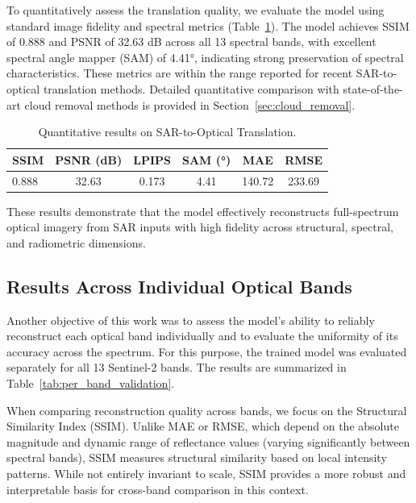 To quantitatively assess the translation quality, we evaluate the model using standard image fidelity and spectral metrics (Table~\ref{tab:quantitative_result_translation}). The model achieves SSIM of 0.888 and PSNR of 32.63 dB across all 13 spectral bands, with excellent spectral angle mapper (SAM) of 4.41°, indicating strong preservation of spectral characteristics. These metrics are within the range reported for recent SAR-to-optical translation methods. Detailed quantitative comparison with state-of-the-art cloud removal methods is provided in Section~\ref{sec:cloud_removal}. 


\begin{table}[!htbp]
    \centering
    \caption{Quantitative results on SAR-to-Optical Translation.}
    \begin{tabular}{lccccc}
        \toprule
        \textbf{SSIM} & \textbf{PSNR (dB)} & \textbf{LPIPS} & \textbf{SAM (°)} & \textbf{MAE} & \textbf{RMSE} \\
        \midrule
        0.888           & 32.63                & 0.173              & 4.41                 & 140.72           & 233.69            \\
        \bottomrule
    \end{tabular}
    \label{tab:quantitative_result_translation}
\end{table}


These results demonstrate that the model effectively reconstructs full-spectrum optical imagery from SAR inputs with high fidelity across structural, spectral, and radiometric dimensions.

\subsection{Results Across Individual Optical Bands}
Another objective of this work was to assess the model’s ability to reliably reconstruct each optical band individually and to evaluate the uniformity of its accuracy across the spectrum. For this purpose, the trained model was evaluated separately for all 13 Sentinel-2 bands. The results are summarized in Table~\ref{tab:per_band_validation}.

When comparing reconstruction quality across bands, we focus on the Structural Similarity Index (SSIM). Unlike MAE or RMSE, which depend on the absolute magnitude and dynamic range of reflectance values (varying significantly between spectral bands), SSIM measures structural similarity based on local intensity patterns. While not entirely invariant to scale, SSIM provides a more robust and interpretable basis for cross-band comparison in this context.


